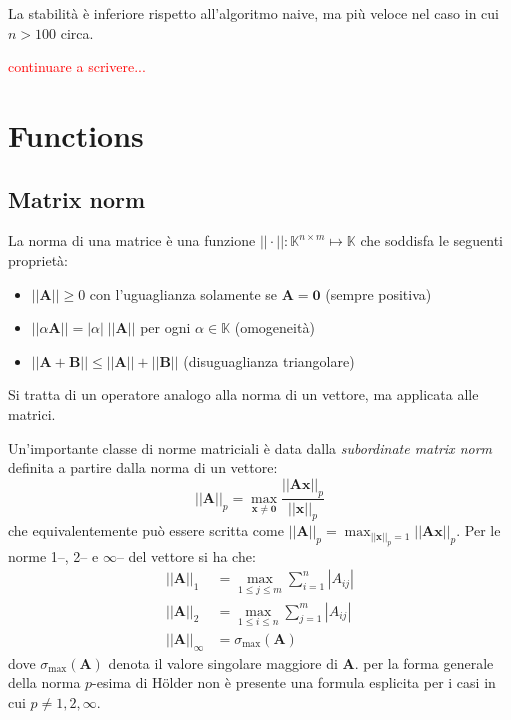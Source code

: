 \documentclass[10pt]{article}
\begin{document}
La stabilità è inferiore rispetto all'algoritmo naive, ma più veloce nel caso in cui $n>100$ circa.

\textcolor{red}{continuare a scrivere...}




\section{Functions}

\subsection{Matrix norm}

La norma di una matrice è una funzione $||\cdot|| : \mathbb{K}^{n\times m} \mapsto \mathbb{K}$ che soddisfa le seguenti proprietà:
\begin{itemize}[noitemsep]
\item $||\mathbf{A}|| \geq 0$ con l'uguaglianza solamente se $\mathbf{A}=\mathbf{0}$ (sempre positiva)
\item $||\alpha\mathbf{A}||=|\alpha| \; ||\mathbf{A}||$ per ogni $\alpha\in\mathbb{K}$ (omogeneità)
\item $||\mathbf{A}+\mathbf{B}||\leq ||\mathbf{A}||+||\mathbf{B}||$ (disuguaglianza triangolare)
\end{itemize}
Si tratta di un operatore analogo alla norma di un vettore, ma applicata alle matrici.

Un'importante classe di norme matriciali è data dalla \textit{subordinate matrix norm} definita a partire dalla norma di un vettore:
\begin{equation}
||\mathbf{A}||_p = \max_{\mathbf{x}\neq\mathbf{0}} \frac{||\mathbf{A}\mathbf{x}||_p}{||\mathbf{x}||_p}
\end{equation}
che equivalentemente può essere scritta come $||\mathbf{A}||_p = \max_{||\mathbf{x}||_p=1} ||\mathbf{A}\mathbf{x}||_p$.
Per le norme 1--, 2-- e $\infty$-- del vettore si ha che:
\begin{align}
||\mathbf{A}||_1 & = \max_{1\leq j\leq m} \sum_{i=1}^n |A_{ij}| \\
||\mathbf{A}||_2 & = \max_{1\leq i\leq n} \sum_{j=1}^m |A_{ij}| \\
||\mathbf{A}||_\infty & = \sigma_{\max}(\mathbf{A})
\end{align}
dove $\sigma_{\max}(\mathbf{A})$ denota il valore singolare maggiore di $\mathbf{A}$. per la forma generale della norma $p$-esima di H\"older non è presente una formula esplicita per i casi in cui $p\neq 1,2,\infty$.
\end{document}

